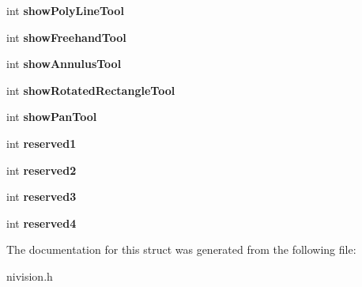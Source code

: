 \begin{DoxyCompactItemize}
\item 
\hypertarget{structToolWindowOptions__struct_a363b56639f1074bb9c0d30859b72bba9}{int {\bfseries show\-Poly\-Line\-Tool}}\label{structToolWindowOptions__struct_a363b56639f1074bb9c0d30859b72bba9}

\item 
\hypertarget{structToolWindowOptions__struct_a50d8ae987ba26589c5ac7df4c20b1a47}{int {\bfseries show\-Freehand\-Tool}}\label{structToolWindowOptions__struct_a50d8ae987ba26589c5ac7df4c20b1a47}

\item 
\hypertarget{structToolWindowOptions__struct_a818d68a1fcb94b2f2bc2099a53abfecc}{int {\bfseries show\-Annulus\-Tool}}\label{structToolWindowOptions__struct_a818d68a1fcb94b2f2bc2099a53abfecc}

\item 
\hypertarget{structToolWindowOptions__struct_a08ff2bd29eb520839c4fc6be913ba20b}{int {\bfseries show\-Rotated\-Rectangle\-Tool}}\label{structToolWindowOptions__struct_a08ff2bd29eb520839c4fc6be913ba20b}

\item 
\hypertarget{structToolWindowOptions__struct_a6fca2ae8b8d7bbdf0ba2c45d70758be8}{int {\bfseries show\-Pan\-Tool}}\label{structToolWindowOptions__struct_a6fca2ae8b8d7bbdf0ba2c45d70758be8}

\item 
\hypertarget{structToolWindowOptions__struct_a46c0b4c963cc0b6c2fc1508e365f11de}{int {\bfseries reserved1}}\label{structToolWindowOptions__struct_a46c0b4c963cc0b6c2fc1508e365f11de}

\item 
\hypertarget{structToolWindowOptions__struct_aff76139b693e2d080c8b847a6f09d99b}{int {\bfseries reserved2}}\label{structToolWindowOptions__struct_aff76139b693e2d080c8b847a6f09d99b}

\item 
\hypertarget{structToolWindowOptions__struct_a5e92c68cc34646918dbd86f8b2672c98}{int {\bfseries reserved3}}\label{structToolWindowOptions__struct_a5e92c68cc34646918dbd86f8b2672c98}

\item 
\hypertarget{structToolWindowOptions__struct_a6e348c178b3dc7defa4035974c77835b}{int {\bfseries reserved4}}\label{structToolWindowOptions__struct_a6e348c178b3dc7defa4035974c77835b}

\end{DoxyCompactItemize}


\-The documentation for this struct was generated from the following file\-:\begin{DoxyCompactItemize}
\item 
nivision.\-h\end{DoxyCompactItemize}
